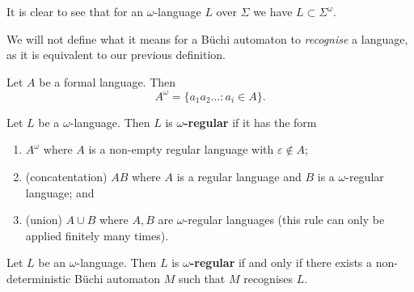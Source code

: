 \begin{remark}
    It is clear to see that for an $\omega$-language $L$
    over $\Sigma$ we have $L \subset \Sigma^\omega$.
\end{remark}

We will not define what it means for a B\"uchi automaton
to \emph{recognise} a language, as it is equivalent to
our previous definition.

\begin{definition}
    Let $A$ be a formal language.
    Then
    \[
        A^\omega = \{a_1a_2\ldots : a_i \in A\}.
    \]
\end{definition}

\begin{definition}
    Let $L$ be a $\omega$-language.
    Then $L$ is \textbf{$\omega$-regular} if it has the form
    \begin{enumerate}
        \item $A^\omega$ where $A$ is a non-empty regular language
            with $\varepsilon \not\in A$;
        \item (concatentation) $AB$ 
            where $A$ is a regular language and
            $B$ is a $\omega$-regular language; and
        \item (union) $A \cup B$ 
            where $A,B$ are $\omega$-regular languages
            (this rule can only be applied finitely many times).
    \end{enumerate}
\end{definition}

\begin{theorem}[]
    Let $L$ be an $\omega$-language.
    Then $L$ is \textbf{$\omega$-regular}
    if and only if
    there exists a non-deterministic B\"uchi automaton
    $M$ such that $M$ recognises $L$.
\end{theorem}

